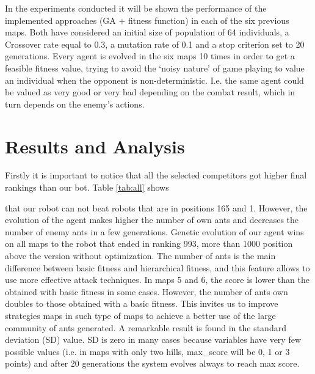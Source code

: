 \documentclass[runningheads]{llncs}
\begin{document}
In the experiments conducted it will be shown the performance of the implemented approaches (GA + fitness function) in each of the six previous maps. Both have considered an initial size of population of 64 individuals, a Crossover rate equal to 0.3, a mutation rate of 0.1 and a stop criterion set to 20 generations. Every agent is evolved in the six maps 10 times in order to get a feasible fitness value, trying to avoid the `noisy nature' \cite{Mora_noisy_jcst} of game playing to value an individual when the opponent is non-deterministic. I.e. the same agent could be valued as very good or very bad depending on the combat result, which in turn depends on the enemy's actions.


\section{Results and Analysis}
\label{sec:results}


Firstly it is important to notice that all the selected competitors got higher final rankings than our bot. Table \ref{tab:all} shows 


that our robot can not beat robots that are in positions 165 and 1. However, the evolution of the agent makes higher the number of own ants and decreases the number of enemy ants in a few generations. Genetic evolution of our agent wins on all maps to the robot that ended in ranking 993, more than 1000 position above the version without optimization. The number of ants is the main difference between basic fitness and hierarchical fitness, and this feature allows to use more effective attack techniques. In maps 5 and 6, the score is lower than the obtained with basic fitness in some cases. However, the number of ants own doubles to those obtained with a basic fitness. This invites us to improve strategies maps in such type of maps to achieve a better use of the large community of ants generated. A remarkable result is found in the standard deviation (SD) value. SD is zero in many cases because variables have very few possible values (i.e. in maps with only two hills, max\_score will be 0, 1 or 3 points) and after 20 generations the system evolves always to reach max score. 
%
%
%
%
\end{document}
